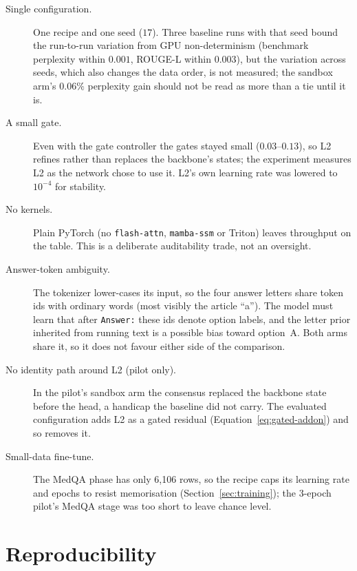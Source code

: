 \documentclass[11pt,a4paper]{article}
\theoremstyle{plain}
\theoremstyle{definition}
\theoremstyle{remark}
\begin{document}
\begin{description}
  \item[Single configuration.] One recipe and one seed ($17$). Three
    baseline runs with that seed bound the run-to-run variation from GPU
    non-determinism (benchmark perplexity within $0.001$, ROUGE-L within
    $0.003$), but the variation across seeds, which also changes the data
    order, is not measured; the sandbox arm's $0.06\%$ perplexity gain should
    not be read as more than a tie until it is.
  \item[A small gate.] Even with the gate controller the gates stayed small
    ($0.03$--$0.13$), so L2 refines rather than replaces the backbone's
    states; the experiment measures L2 as the network chose to use it. L2's
    own learning rate was lowered to $10^{-4}$ for stability.
  \item[No kernels.] Plain PyTorch (no \texttt{flash-attn}, \texttt{mamba-ssm}
    or Triton) leaves throughput on the table. This is a deliberate
    auditability trade, not an oversight.
  \item[Answer-token ambiguity.] The tokenizer lower-cases its input, so the
    four answer letters share token ids with ordinary words (most visibly the
    article ``a''). The model must learn that after \texttt{Answer:} these ids
    denote option labels, and the letter prior inherited from running text is a
    possible bias toward option~A. Both arms share it, so it does not favour
    either side of the comparison.
  \item[No identity path around L2 (pilot only).] In the pilot's sandbox arm
    the consensus replaced the backbone state before the head, a handicap the
    baseline did not carry. The evaluated configuration adds L2 as a gated
    residual (Equation~\ref{eq:gated-addon}) and so removes it.
  \item[Small-data fine-tune.] The MedQA phase has only 6{,}106 rows, so the
    recipe caps its learning rate and epochs to resist memorisation
    (Section~\ref{sec:training}); the 3-epoch pilot's MedQA stage was too
    short to leave chance level.
\end{description}

\section{Reproducibility}
\end{document}
